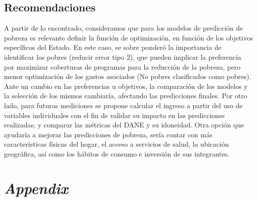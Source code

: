 \documentclass[11pt]{article}
\begin{document}
\subsection{Recomendaciones}
  \justify
A partir de lo encontrado, consideramos que para los modelos de predicción de pobreza es relevante definir la función de optimización, en función de los objetivos específicos del Estado. En este caso, se sobre ponderó la importancia de identificar los pobres (reducir error tipo 2), que pueden implicar la preferencia por maximizar coberturas de programas para la reducción de la pobreza, pero menor optimización de los gastos asociados (No pobres clasificados como pobres). Ante un cambio en las preferencias u objetivos, la comparación de los modelos y la selección de los mismos cambiaría, afectando las predicciones finales.
\justify
Por otro lado, para futuras mediciones se propone calcular el ingreso a partir del uso de variables individuales con el fin de validar su impacto en las predicciones realizadas; y comparar las métricas del DANE y su idoneidad. Otra opción que ayudaría a mejorar las predicciones de pobreza, sería contar con más características físicas del hogar, el acceso a servicios de salud, la ubicación geográfica, así como los hábitos de consumo e inversión de sus integrantes. 



\pagebreak
\singlespacing


\pagebreak





\pagebreak
\appendix
\renewcommand{\theequation}{\Alph{chapter}.\arabic{equation}}

\setcounter{figure}{0}
\setcounter{table}{0}
\makeatletter 
\renewcommand{\thefigure}{A.\@arabic\c@figure}
\renewcommand{\thetable}{A.\@arabic\c@table}

\section{\bf\emph {Appendix}}\label{sec:appendix_tables} 
\end{document}
